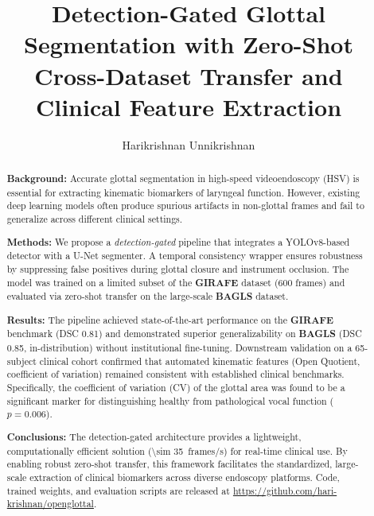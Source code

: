 \documentclass[preprint,12pt]{elsarticle}
\newcommand{\girafe}{\textbf{GIRAFE}}
\newcommand{\bagls}{\textbf{BAGLS}}
\begin{document}
\begin{frontmatter}

\title{Detection-Gated Glottal Segmentation with Zero-Shot Cross-Dataset
       Transfer and Clinical Feature Extraction}

\author[1]{Harikrishnan Unnikrishnan}

\address[1]{Orchard Robotics, San Francisco, California 94102, USA}

\begin{abstract}

\noindent\textbf{Background:}
Accurate glottal segmentation in high-speed videoendoscopy (HSV) is
essential for extracting kinematic biomarkers of laryngeal function.
However, existing deep learning models often produce spurious artifacts in
non-glottal frames and fail to generalize across different clinical
settings.

\noindent\textbf{Methods:}
We propose a \emph{detection-gated} pipeline that integrates a
YOLOv8-based detector with a U-Net segmenter.
A temporal consistency wrapper ensures robustness by suppressing false
positives during glottal closure and instrument occlusion.
The model was trained on a limited subset of the \girafe{} dataset
(\num{600} frames) and evaluated via zero-shot transfer on the large-scale
\bagls{} dataset.

\noindent\textbf{Results:}
The pipeline achieved state-of-the-art performance on the \girafe{}
benchmark (DSC \num{0.81}) and demonstrated superior generalizability on
\bagls{} (DSC \num{0.85}, in-distribution) without institutional
fine-tuning.
Downstream validation on a \num{65}-subject clinical cohort confirmed that
automated kinematic features (Open Quotient, coefficient of variation)
remained consistent with established clinical benchmarks.
Specifically, the coefficient of variation (CV) of the glottal area was
found to be a significant marker for distinguishing healthy from
pathological vocal function ($p{=}0.006$).

\noindent\textbf{Conclusions:}
The detection-gated architecture provides a lightweight, computationally
efficient solution (\SI{\sim 35}{frames/s}) for real-time clinical use.
By enabling robust zero-shot transfer, this framework facilitates the
standardized, large-scale extraction of clinical biomarkers across diverse
endoscopy platforms.
Code, trained weights, and evaluation scripts are released at
\url{https://github.com/hari-krishnan/openglottal}.
\end{abstract}


\end{frontmatter}
\end{document}
